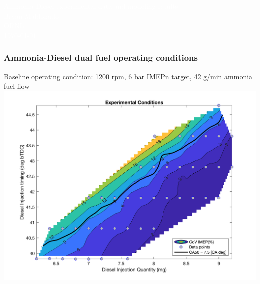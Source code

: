 \documentclass[aspectratio=169, 10pt]{beamer}
\begin{document}
%
%
{
\begin{frame}
\textcolor{white}{\Huge Ammonia-Diesel experimental data and modeling results}\\
\vspace*{0.7cm}
\textcolor{white}{\Large Bryan Maldonado}\\
\textcolor{white}{ ORNL}\\
\textcolor{white}{ \today}


\end{frame}
}

%
%
\begin{frame}
\frametitle{Ammonia-Diesel dual fuel operating conditions}
	\centering
		Baseline operating condition: 1200 rpm, 6 bar IMEPn target, 42 g/min ammonia fuel flow
		\includegraphics[height=0.85\textheight]{../Model_Plots/Overview.png}
\end{frame}
\end{document}
